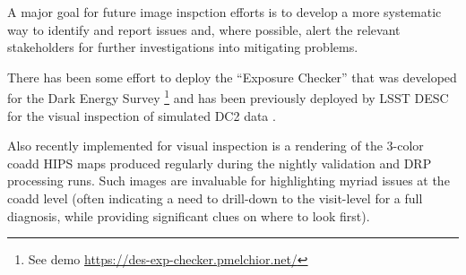 A major goal for future image inspction efforts is to develop a more systematic
way to identify and report issues and, where possible, alert the
relevant stakeholders for further investigations into mitigating problems.

There has been some effort to deploy the ``Exposure Checker'' that was developed for the Dark Energy Survey \citep{2016A&C....16...99M}\footnote{See demo \url{https://des-exp-checker.pmelchior.net/}} and has been previously deployed by LSST DESC for the visual inspection of simulated DC2 data \citep{2021ApJS..253...31L}.

Also recently implemented for visual inspection is a rendering of the 3-color coadd
HIPS maps produced regularly during the nightly validation and DRP processing runs.
Such images are invaluable for highlighting myriad issues at the coadd level (often
indicating a need to drill-down to the visit-level for a full diagnosis, while
providing significant clues on where to look first).
